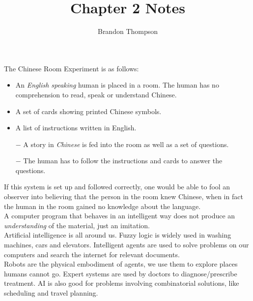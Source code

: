 \documentclass[a4paper]{article}
\begin{document}
	\author{Brandon Thompson}
	\title{Chapter 2 Notes}
	\maketitle
	\medskip
	
	The Chinese Room Experiment is as follows:
	\begin{itemize}
		\item An \textit{English speaking} human is placed in a room. The human
			has no comprehension to read, speak or understand Chinese.
		\item A set of cards showing printed Chinese symbols.
		\item A list of instructions written in English.

		\item[$-$] A story in \textit{Chinese} is fed into the room as well as a set of questions.
		\item[$-$] The human has to follow the instructions and cards to answer the questions.
	\end{itemize}
	If this system is set up and followed correctly, one would be able to fool an observer into
	believing that the person in the room knew Chinese, when in fact the human in the room gained
	no knowledge about the language. \\
	A computer program that behaves in an intelligent way does not produce an \textit{understanding}
	of the material, just an imitation.\\
	
	Artificial intelligence is all around us. Fuzzy logic is widely used in washing machines,
	cars and elevators. Intelligent agents are used to solve problems on our computers and
	search the internet for relevant documents.\\
	Robots are the physical embodiment of agents, we use them to explore places humans cannot
	go. Expert systems are used by doctors to diagnose/prescribe treatment. AI is also good
	for problems involving combinatorial solutions, like scheduling and travel planning.\\
\end{document}
